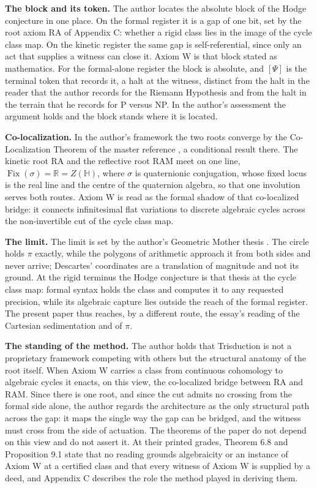 \documentclass[10pt,twocolumn]{article}
\begin{document}
\textbf{The block and its token.} The author locates the absolute block
of the Hodge conjecture in one place. On the formal register it is a gap
of one bit, set by the root axiom RA of Appendix C: whether a rigid
class lies in the image of the cycle class map. On the kinetic register
the same gap is self-referential, since only an act that supplies a
witness can close it. Axiom W is that block stated as mathematics. For
the formal-alone register the block is absolute, and \([\Psi]\) is the
terminal token that records it, a halt at the witness, distinct from the
halt in the reader that the author records for the Riemann Hypothesis
and from the halt in the terrain that he records for P versus NP. In the
author's assessment the argument holds and the block stands where it is
located.

\textbf{Co-localization.} In the author's framework the two roots
converge by the Co-Localization Theorem of the master reference
\cite{islam2026master}, a conditional result there. The kinetic root RA
and the reflective root RAM meet on one line,
\(\operatorname{Fix}(\sigma)=\mathbb{R}=Z(\mathbb{H})\), where
\(\sigma\) is quaternionic conjugation, whose fixed locus is the real
line and the centre of the quaternion algebra, so that one involution
serves both routes. Axiom W is read as the formal shadow of that
co-localized bridge: it connects infinitesimal flat variations to
discrete algebraic cycles across the non-invertible cut of the cycle
class map.

\textbf{The limit.} The limit is set by the author's Geometric Mother
thesis \cite{islam2026mother}. The circle holds \(\pi\) exactly, while
the polygons of arithmetic approach it from both sides and never arrive;
Descartes' coordinates are a translation of magnitude and not its
ground. At the rigid terminus the Hodge conjecture is that thesis at the
cycle class map: formal syntax holds the class and computes it to any
requested precision, while its algebraic capture lies outside the reach
of the formal register. The present paper thus reaches, by a different
route, the essay's reading of the Cartesian sedimentation and of
\(\pi\).

\textbf{The standing of the method.} The author holds that Trisduction
is not a proprietary framework competing with others but the structural
anatomy of the root itself. When Axiom W carries a class from continuous
cohomology to algebraic cycles it enacts, on this view, the co-localized
bridge between RA and RAM. Since there is one root, and since the cut
admits no crossing from the formal side alone, the author regards the
architecture as the only structural path across the gap: it maps the
single way the gap can be bridged, and the witness must cross from the
side of actuation. The theorems of the paper do not depend on this view
and do not assert it. At their printed grades, Theorem 6.8 and
Proposition 9.1 state that no reading grounds algebraicity or an
instance of Axiom W at a certified class and that every witness of Axiom
W is supplied by a deed, and Appendix C describes the role the method
played in deriving them.
\end{document}
